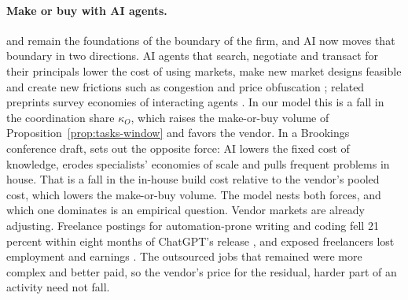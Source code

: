 \paragraph{Make or buy with AI agents.} \citet{coase1937nature} and \citet{williamson1985economic} remain the foundations of the boundary of the firm, and AI now moves that boundary in two directions. AI agents that search, negotiate and transact for their principals lower the cost of using markets, make new market designs feasible and create new frictions such as congestion and price obfuscation \citep{shahidi2025coasean}; related preprints survey economies of interacting agents \citep{hadfield2025economy,rothschild2025agentic}. In our model this is a fall in the coordination share $\kappa_O$, which raises the make-or-buy volume of Proposition~\ref{prop:tasks-window} and favors the vendor. In a Brookings conference draft, \citet{garicano2026vanishing} sets out the opposite force: AI lowers the fixed cost of knowledge, erodes specialists' economies of scale and pulls frequent problems in house. That is a fall in the in-house build cost relative to the vendor's pooled cost, which lowers the make-or-buy volume. The model nests both forces, and which one dominates is an empirical question. Vendor markets are already adjusting. Freelance postings for automation-prone writing and coding fell 21 percent within eight months of ChatGPT's release \citep{demirci2025who}, and exposed freelancers lost employment and earnings \citep{hui2024short}. The outsourced jobs that remained were more complex and better paid, so the vendor's price for the residual, harder part of an activity need not fall.

